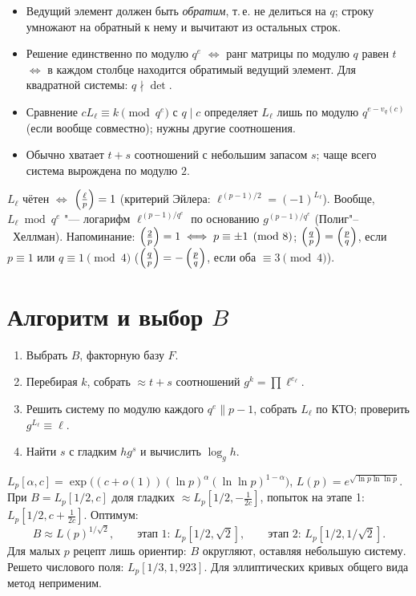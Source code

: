 \documentclass{ca-handout}
\begin{document}
\begin{reminder}[title={Метод Гаусса по модулю $q^e$}]
\begin{itemize}
  \item Ведущий элемент должен быть \emph{обратим}, т.\,е. не делиться на $q$; строку умножают на
    обратный к нему и вычитают из остальных строк.
  \item Решение единственно по модулю $q^e$ $\iff$ ранг матрицы по модулю $q$ равен $t$ $\iff$
    в каждом столбце находится обратимый ведущий элемент. Для квадратной системы: $q \nmid \det$.
  \item Сравнение $c L_\ell \equiv k \pmod{q^e}$ с $q \mid c$ определяет $L_\ell$ лишь по модулю
    $q^{e - v_q(c)}$ (если вообще совместно); нужны другие соотношения.
  \item Обычно хватает $t + s$ соотношений с небольшим запасом $s$; чаще всего система
    вырождена по модулю $2$.
\end{itemize}
\end{reminder}

\begin{reminder}[title={Проверка и подсказка по модулю малых $q$}]
$L_\ell$ чётен $\iff$ $\left(\frac{\ell}{p}\right) = 1$ (критерий Эйлера: $\ell^{(p-1)/2} = (-1)^{L_\ell}$).
Вообще, $L_\ell \bmod q^e$ "--- логарифм $\ell^{(p-1)/q^e}$ по основанию $g^{(p-1)/q^e}$
(Полиг"--~Хеллман). Напоминание: $\left(\frac{2}{p}\right) = 1 \iff p \equiv \pm 1 \pmod 8$;
$\left(\frac{q}{p}\right) = \left(\frac{p}{q}\right)$, если $p \equiv 1$ или $q \equiv 1 \pmod 4$
($\left(\frac{q}{p}\right) = -\left(\frac{p}{q}\right)$, если оба $\equiv 3 \pmod 4$).
\end{reminder}

\section{Алгоритм и выбор \texorpdfstring{$B$}{B}}
\begin{enumerate}
  \item Выбрать $B$, факторную базу $F$.
  \item Перебирая $k$, собрать $\approx t + s$ соотношений $g^k = \prod \ell^{e_\ell}$.
  \item Решить систему по модулю каждого $q^e \parallel p - 1$, собрать $L_\ell$ по КТО;
    проверить $g^{L_\ell} \equiv \ell$.
  \item Найти $s$ с гладким $h g^{s}$ и вычислить $\log_g h$.
\end{enumerate}

\begin{reminder}[title={$L$-нотация и сложность (эвристически)}]
$L_p[\alpha, c] = \exp\bigl((c + o(1))(\ln p)^{\alpha}(\ln\ln p)^{1-\alpha}\bigr)$,
$L(p) = e^{\sqrt{\ln p \ln\ln p}}$. При $B = L_p[1/2, c]$ доля гладких $\approx
L_p[1/2, -\frac{1}{2c}]$, попыток на этапе 1: $L_p[1/2, c + \frac{1}{2c}]$. Оптимум:
\[
  B \approx L(p)^{1/\sqrt 2}, \qquad \text{этап 1: } L_p[1/2, \sqrt 2], \qquad
  \text{этап 2: } L_p[1/2, 1/\sqrt 2].
\]
Для малых $p$ рецепт лишь ориентир: $B$ округляют, оставляя небольшую систему.
Решето числового поля: $L_p[1/3, 1{,}923]$. Для эллиптических кривых общего вида метод
неприменим.
\end{reminder}
\end{document}
